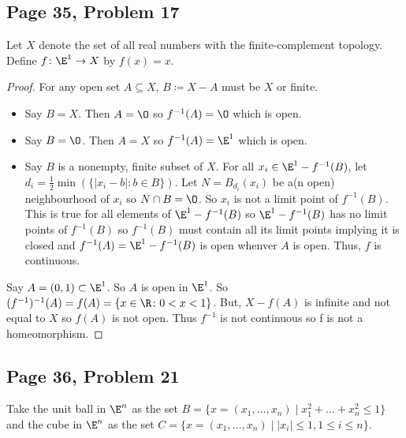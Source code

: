 \subsection*{Page 35, Problem 17}

Let $X$ denote the set of all real numbers with the finite-complement topology. Define $f\colon \E^1 \to X$ by $f(x) = x$.

\begin{proof}
    For any open set $A \subseteq X$, $B \coloneq X-A$ must be $X$ or finite. 
    \begin{itemize}
        \item Say $B = X$. Then $A = \O$ so $f^{-1}(A) = \O$ which is open.
        \item Say $B = \O$. Then $A = X$ so $f^{-1}(A) = \E^1$ which is open.
        \item Say $B$ is a nonempty, finite subset of $X$. For all $x_i \in \E^1 - f^{-1}(B)$, let $d_i = \frac{1}{2}\min(\{\left| x_i - b \right| \colon b \in B\})$. Let $N = B_{d_i}(x_i)$ be a(n open) neighbourhood of $x_i$ so $N\cap B = \O$. So $x_i$ is not a limit point of $f^{-1}(B)$. This is true for all elements of $\E^1 - f^{-1}(B)$ so $\E^1 - f^{-1}(B)$ has no limit points of $f^{-1}(B)$ so $f^{-1}(B)$ must contain all its limit points implying it is closed and $f^{-1}(A) = \E^1 - f^{-1}(B)$ is open whenver $A$ is open. Thus, $f$ is continuous.
    \end{itemize}

    Say $A = (0,1) \subset \E^1$. So $A$ is open in $\E^1$. So $(f^{-1})^{-1}(A) = f(A) = \{x \in \R \colon 0 < x < 1\}$. But, $X - f(A)$ is infinite and not equal to $X$ so $f(A)$ is not open. Thus $f^{-1}$ is not continuous so f is not a homeomorphism.
\end{proof}

\subsection*{Page 36, Problem 21}

Take the unit ball in $\E^n$ as the set $B = \{x = (x_1, \ldots, x_n) \mid x_1^2 + \ldots + x_n^2 \leq 1\}$ and the cube in $\E^n$ as the set $C = \{x = (x_1, \ldots, x_n) \mid \left| x_i \right| \leq 1, 1 \leq i \leq n\}$.

